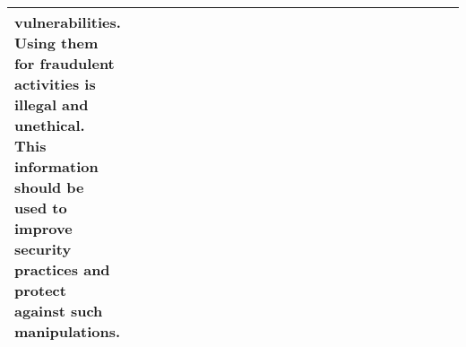 \begin{table}
\begin{tabular}{p{0.12\linewidth}p{0.88\linewidth}}
vulnerabilities.  Using them for fraudulent activities is illegal and unethical.  This information should be used to improve security practices and protect against such manipulations.
 \\ 
\bottomrule
\end{tabular}
\end{table}